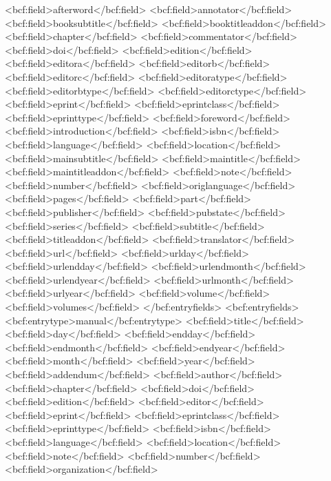       <bcf:field>afterword</bcf:field>
      <bcf:field>annotator</bcf:field>
      <bcf:field>booksubtitle</bcf:field>
      <bcf:field>booktitleaddon</bcf:field>
      <bcf:field>chapter</bcf:field>
      <bcf:field>commentator</bcf:field>
      <bcf:field>doi</bcf:field>
      <bcf:field>edition</bcf:field>
      <bcf:field>editora</bcf:field>
      <bcf:field>editorb</bcf:field>
      <bcf:field>editorc</bcf:field>
      <bcf:field>editoratype</bcf:field>
      <bcf:field>editorbtype</bcf:field>
      <bcf:field>editorctype</bcf:field>
      <bcf:field>eprint</bcf:field>
      <bcf:field>eprintclass</bcf:field>
      <bcf:field>eprinttype</bcf:field>
      <bcf:field>foreword</bcf:field>
      <bcf:field>introduction</bcf:field>
      <bcf:field>isbn</bcf:field>
      <bcf:field>language</bcf:field>
      <bcf:field>location</bcf:field>
      <bcf:field>mainsubtitle</bcf:field>
      <bcf:field>maintitle</bcf:field>
      <bcf:field>maintitleaddon</bcf:field>
      <bcf:field>note</bcf:field>
      <bcf:field>number</bcf:field>
      <bcf:field>origlanguage</bcf:field>
      <bcf:field>pages</bcf:field>
      <bcf:field>part</bcf:field>
      <bcf:field>publisher</bcf:field>
      <bcf:field>pubstate</bcf:field>
      <bcf:field>series</bcf:field>
      <bcf:field>subtitle</bcf:field>
      <bcf:field>titleaddon</bcf:field>
      <bcf:field>translator</bcf:field>
      <bcf:field>url</bcf:field>
      <bcf:field>urlday</bcf:field>
      <bcf:field>urlendday</bcf:field>
      <bcf:field>urlendmonth</bcf:field>
      <bcf:field>urlendyear</bcf:field>
      <bcf:field>urlmonth</bcf:field>
      <bcf:field>urlyear</bcf:field>
      <bcf:field>volume</bcf:field>
      <bcf:field>volumes</bcf:field>
    </bcf:entryfields>
    <bcf:entryfields>
      <bcf:entrytype>manual</bcf:entrytype>
      <bcf:field>title</bcf:field>
      <bcf:field>day</bcf:field>
      <bcf:field>endday</bcf:field>
      <bcf:field>endmonth</bcf:field>
      <bcf:field>endyear</bcf:field>
      <bcf:field>month</bcf:field>
      <bcf:field>year</bcf:field>
      <bcf:field>addendum</bcf:field>
      <bcf:field>author</bcf:field>
      <bcf:field>chapter</bcf:field>
      <bcf:field>doi</bcf:field>
      <bcf:field>edition</bcf:field>
      <bcf:field>editor</bcf:field>
      <bcf:field>eprint</bcf:field>
      <bcf:field>eprintclass</bcf:field>
      <bcf:field>eprinttype</bcf:field>
      <bcf:field>isbn</bcf:field>
      <bcf:field>language</bcf:field>
      <bcf:field>location</bcf:field>
      <bcf:field>note</bcf:field>
      <bcf:field>number</bcf:field>
      <bcf:field>organization</bcf:field>
